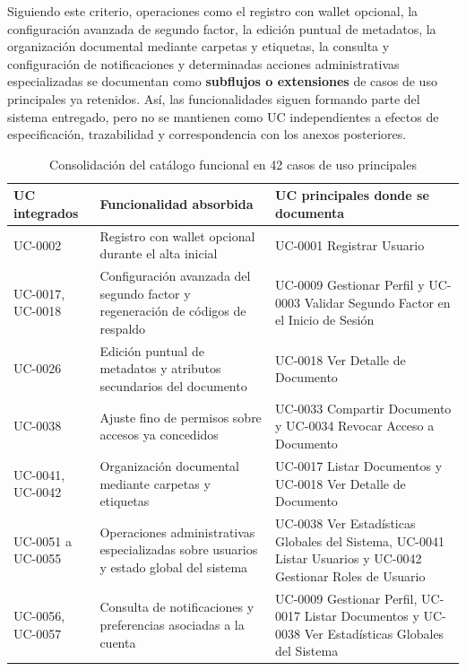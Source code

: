 \documentclass[11pt, a4paper]{article}
\begin{document}
Siguiendo este criterio, operaciones como el registro con wallet opcional, la configuración avanzada de segundo factor, la edición puntual de metadatos, la organización documental mediante carpetas y etiquetas, la consulta y configuración de notificaciones y determinadas acciones administrativas especializadas se documentan como \textbf{subflujos o extensiones} de casos de uso principales ya retenidos. Así, las funcionalidades siguen formando parte del sistema entregado, pero no se mantienen como UC independientes a efectos de especificación, trazabilidad y correspondencia con los anexos posteriores.

\begin{table}[H]
    \centering
    \small
    \begin{tabular}{|p{2.6cm}|p{6.0cm}|p{5.0cm}|}
    \hline
    \textbf{UC integrados} & \textbf{Funcionalidad absorbida} & \textbf{UC principales donde se documenta} \\
    \hline
    UC-0002 & Registro con wallet opcional durante el alta inicial & UC-0001 Registrar Usuario \\
    \hline
    UC-0017, UC-0018 & Configuración avanzada del segundo factor y regeneración de códigos de respaldo & UC-0009 Gestionar Perfil y UC-0003 Validar Segundo Factor en el Inicio de Sesión \\
    \hline
    UC-0026 & Edición puntual de metadatos y atributos secundarios del documento & UC-0018 Ver Detalle de Documento \\
    \hline
    UC-0038 & Ajuste fino de permisos sobre accesos ya concedidos & UC-0033 Compartir Documento y UC-0034 Revocar Acceso a Documento \\
    \hline
    UC-0041, UC-0042 & Organización documental mediante carpetas y etiquetas & UC-0017 Listar Documentos y UC-0018 Ver Detalle de Documento \\
    \hline
    UC-0051 a UC-0055 & Operaciones administrativas especializadas sobre usuarios y estado global del sistema & UC-0038 Ver Estadísticas Globales del Sistema, UC-0041 Listar Usuarios y UC-0042 Gestionar Roles de Usuario \\
    \hline
    UC-0056, UC-0057 & Consulta de notificaciones y preferencias asociadas a la cuenta & UC-0009 Gestionar Perfil, UC-0017 Listar Documentos y UC-0038 Ver Estadísticas Globales del Sistema \\
    \hline
    \end{tabular}
    \caption{Consolidación del catálogo funcional en 42 casos de uso principales}
    \label{tab:consolidacion-uc}
\end{table}
\end{document}

